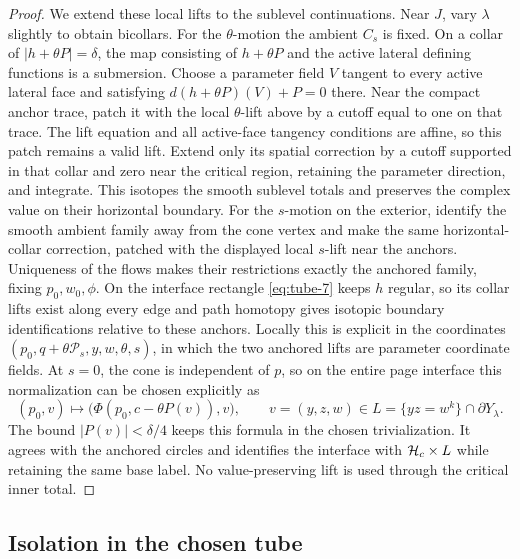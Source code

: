 \begin{proof}
We extend these local lifts to the sublevel continuations.
Near \(J\), vary \(\lambda\) slightly to obtain bicollars.
For the \(\theta\)-motion the ambient \(C_s\) is fixed. On a collar
of \(|h+\theta P|=\delta\), the map consisting of \(h+\theta P\)
and the active lateral defining functions is a submersion. Choose
a parameter field \(V\) tangent to every active lateral face and
satisfying \(d(h+\theta P)(V)+P=0\) there. Near the compact anchor
trace, patch it with the local \(\theta\)-lift above by a cutoff
equal to one on that trace. The lift equation and all active-face
tangency conditions are affine, so this patch remains a valid lift.
Extend only its spatial correction by a cutoff supported in that
collar and zero near the critical region, retaining the parameter
direction, and integrate.
This isotopes the smooth sublevel totals and preserves the complex
value on their horizontal boundary. For the \(s\)-motion on the exterior,
identify the smooth ambient family away from the cone vertex and make
the same horizontal-collar correction, patched with the displayed
local \(s\)-lift near the anchors. Uniqueness of the flows makes
their restrictions exactly the anchored family, fixing
\(p_0,w_0,\phi\). On the interface rectangle
\eqref{eq:tube-7} keeps \(h\) regular, so its collar lifts exist along
every edge and path homotopy gives isotopic boundary identifications
relative to these anchors. Locally this is explicit in the coordinates
\((p_0,q+\theta\mathcal P_s,y,w,\theta,s)\), in which the two
anchored lifts are parameter coordinate fields.
At \(s=0\), the cone is independent of \(p\), so on the entire
page interface this normalization can be chosen explicitly as
\[
 (p_0,v)\longmapsto\bigl(\Phi(p_0,c-\theta P(v)),v\bigr),
 \qquad v=(y,z,w)\in L=\{yz=w^k\}\cap\partial Y_\lambda.
\]
The bound \(|P(v)|<\delta/4\) keeps this formula in the chosen
trivialization. It agrees with the anchored circles and identifies
the interface with \(\mathcal H_c\times L\) while retaining the same
base label. No value-preserving lift is used through the critical
inner total.
\end{proof}

\subsection{Isolation in the chosen tube}

